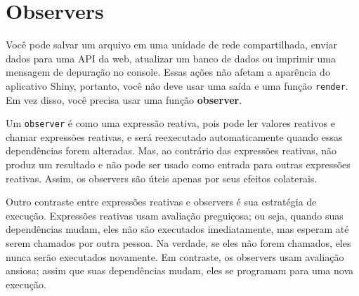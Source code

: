 \documentclass[
]{book}
\newenvironment{Shaded}{\begin{snugshade}}{\end{snugshade}}
\newcommand{\CommentTok}[1]{\textcolor[rgb]{0.56,0.35,0.01}{\textit{#1}}}
\newcommand{\ControlFlowTok}[1]{\textcolor[rgb]{0.13,0.29,0.53}{\textbf{#1}}}
\newcommand{\FunctionTok}[1]{\textcolor[rgb]{0.00,0.00,0.00}{#1}}
\newcommand{\NormalTok}[1]{#1}
\newcommand{\OtherTok}[1]{\textcolor[rgb]{0.56,0.35,0.01}{#1}}
\newcommand{\SpecialCharTok}[1]{\textcolor[rgb]{0.00,0.00,0.00}{#1}}
\newcommand{\StringTok}[1]{\textcolor[rgb]{0.31,0.60,0.02}{#1}}
\begin{document}
\begin{Shaded}
\end{Shaded}

\hypertarget{observers}{%
\section{\texorpdfstring{\textbf{Observers}}{Observers}}\label{observers}}

Você pode salvar um arquivo em uma unidade de rede compartilhada, enviar dados para uma API da web, atualizar um banco de dados ou imprimir uma mensagem de depuração no console. Essas ações não afetam a aparência do aplicativo Shiny, portanto, você não deve usar uma saída e uma função \texttt{render}. Em vez disso, você precisa usar uma função \textbf{observer}.

Um \texttt{observer} é como uma expressão reativa, pois pode ler valores reativos e chamar expressões reativas, e será reexecutado automaticamente quando essas dependências forem alteradas. Mas, ao contrário das expressões reativas, não produz um resultado e não pode ser usado como entrada para outras expressões reativas. Assim, os observers são úteis apenas por seus efeitos colaterais.

Outro contraste entre expressões reativas e observers é sua estratégia de execução. Expressões reativas usam avaliação preguiçosa; ou seja, quando suas dependências mudam, eles não são executados imediatamente, mas esperam até serem chamados por outra pessoa. Na verdade, se eles não forem chamados, eles nunca serão executados novamente. Em contraste, os observers usam avaliação ansiosa; assim que suas dependências mudam, eles se programam para uma nova execução.
\end{document}
